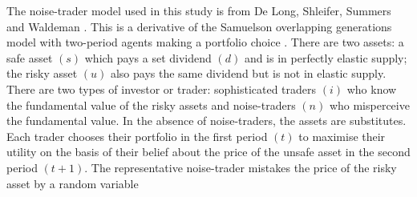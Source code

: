 \documentclass[12pt, a4paper, oneside]{article} %
\begin{document}




The noise-trader model used in this study is from De Long, Shleifer, Summers and Waldeman \citep{Delong1990noise}. This is a derivative of the Samuelson overlapping generations model  with two-period agents making a portfolio choice \citep{Samuelson1958}.  There are two assets:  a safe asset $(s)$ which pays a set dividend $(d)$ and is in perfectly elastic supply; the risky asset $(u)$ also pays the same dividend but is not in elastic supply.  There are two types of investor or trader: sophisticated traders $(i)$ who know the fundamental value of the risky assets and noise-traders $(n)$ who misperceive the fundamental value.  In the absence of noise-traders, the assets are substitutes.  Each trader chooses their portfolio in the first period $(t)$ to maximise their utility on the basis of their belief about the price of the unsafe asset in the second period $(t + 1)$.  The representative noise-trader mistakes the price of the risky asset by a random variable 
\end{document}
